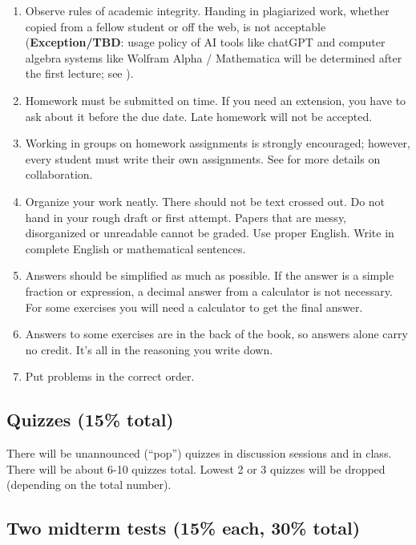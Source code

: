 \documentclass[oneside,11pt]{amsart}
\begin{document}
\begin{enumerate}[$\bullet$]
	\item Observe rules of academic integrity.
		Handing in plagiarized work, whether copied from a fellow student or off the web, is not acceptable (\textbf{Exception/TBD}: usage policy of AI tools like chatGPT and computer algebra systems like Wolfram Alpha / Mathematica will be determined after the first lecture; see ).
    
	\item Homework must be submitted on time. If you need an extension, you have to ask about it before the due date. Late homework will not be accepted.
    
    \item Working in groups on homework assignments is strongly encouraged; however, every student must write their own assignments. See  for more details on collaboration.
    
    \item Organize your work neatly. 
There should not be text crossed out.
Do not hand in your rough draft or first attempt.
Papers that are messy, disorganized or unreadable cannot be graded. Use proper English. Write in complete English or mathematical sentences.
    \item Answers should be simplified as much as possible. If the answer is a simple fraction or expression, a decimal answer from a calculator is not necessary. For some exercises you will need a calculator to get the final answer.
    
    \item Answers to some exercises are in the back of the book, so answers alone carry no credit. It's all in the reasoning you write down.
    
    \item Put problems in the correct order.
\end{enumerate}

\subsection{Quizzes (15\% total)}
 There will be unannounced (``pop'') quizzes in discussion sessions and in class. There will be about 6-10 quizzes total. Lowest 2 or 3 quizzes will be dropped (depending on the total number).


\subsection{Two midterm tests (15\% each, 30\% total)}
\end{document}

